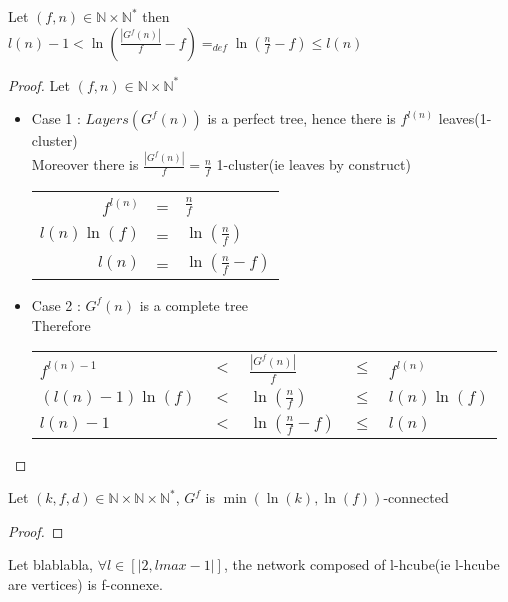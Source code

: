 \begin{prop}
  Let $(f,n) \in \mathbb{N} \times \mathbb{N}^{*}$ then $l(n)-1 < \ln(\frac{|G^{f}(n)|}{f}-f) =_{def} \ln(\frac{n}{f}-f) \leq l(n)$\\ 
\end{prop}

\begin{proof}Let $(f,n) \in \mathbb{N} \times \mathbb{N}^{*}$\\
  \begin{itemize}
   \item Case 1 :   $Layers(G^{f}(n))$ is a perfect tree, hence there is $f^{l(n)}$ leaves(1-cluster)\\
      Moreover there is $\frac{|G^{f}(n)|}{f}=\frac{n}{f}$ 1-cluster(ie leaves by construct)\\
    \begin{tabular}{rcl}
      $f^{l(n)}$ & = & $\frac{n}{f}$ \\
      $l(n)\ln(f)$ & = & $\ln(\frac{n}{f})$\\
      $l(n)$ & = & $\ln(\frac{n}{f}-f)$\\ 
    \end{tabular}
   \item Case 2 :   $G^{f}(n)$ is a complete tree\\
     Therefore 
    \begin{tabular}{lclcl}
      $f^{l(n)-1}$ & $<$ & $\frac{|G^{f}(n)|}{f}$ & $\leq$ & $f^{l(n)}$\\
      $(l(n)-1)\ln(f)$ & $<$ & $\ln(\frac{n}{f})$ & $\leq$ & $l(n)\ln(f)$\\
      $l(n)-1$ & $<$ & $\ln(\frac{n}{f}-f)$ & $\leq$ & $l(n)$\\ 
    \end{tabular}
  \end{itemize}
\end{proof}


 
 
\begin{lemma} \label{lemma-min_connexity}
  Let $(k,f,d) \in \mathbb{N} \times \mathbb{N} \times \mathbb{N}^{*}$, $G^{f}$ is $\min(\ln(k),\ln(f))$-connected
\end{lemma}
 
 \begin{proof}
  
 \end{proof}
 
 \begin{lemma}
  Let blablabla, $\forall l \in [|2,lmax-1|]$, the network composed of l-hcube(ie l-hcube are vertices) is f-connexe.
 \end{lemma}

